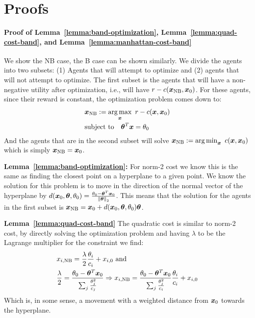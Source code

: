 \section{Proofs}\label{sec:app-proofs}

\paragraph{Proof of Lemma~\ref{lemma:band-optimization}, Lemma~\ref{lemma:quad-cost-band}, and Lemma~\ref{lemma:manhattan-cost-band}}We show the NB case, the B case can be shown similarly. We divide the agents into two subsets: (1) Agents that will attempt to optimize and (2) agents that will not attempt to optimize. The first subset is the agents that will have a non-negative utility after optimization, i.e., will have $r-c({\bm{x}}_\text{NB}, {\bm{x}}_0)$. For these agents, since their reward is constant, the optimization problem comes down to:
\begin{align}
    &{\bm{x}}_\text{NB} := \operatorname*{arg\,max}_{\bm{x}} ~ r - c({\bm{x}}, {\bm{x}}_0) \notag\\
    &\text{subject to}\quad {\bm{\theta}}^T{\bm{x}} = \theta_0
\end{align}
And the agents that are in the second subset will solve ${\bm{x}}_\text{NB} := \operatorname*{arg\,min}_{\bm{x}} ~ c({\bm{x}}, {\bm{x}}_0)$ which is simply ${\bm{x}}_\text{NB}={\bm{x}}_0$.

\textbf{Lemma~\ref{lemma:band-optimization}:} For norm-2 cost we know this is the same as finding the closest point on a hyperplane to a given point. We know the solution for this problem is to move in the direction of the normal vector of the hyperplane by $d({\bm{x}}_0, {\bm{\theta}}, \theta_0)=\frac{\theta_0-{\bm{\theta}}^T{\bm{x}}_0}{\norm{{\bm{\theta}}}_2}$. This means that the solution for the agents in the first subset is ${\bm{x}}_\text{NB} = {\bm{x}}_0 + d({\bm{x}}_0, {\bm{\theta}}, \theta_{0}){\bm{\theta}}$.

\textbf{Lemma~\ref{lemma:quad-cost-band}} The quadratic cost is similar to norm-2 cost, by directly solving the optimization problem and having $\lambda$ to be the Lagrange multiplier for the constraint we find:
\begin{align}
    &x_{i, \text{NB}} = \frac{\lambda}{2}\frac{\theta_i}{c_i}+x_{i, 0} \text{ and } \notag\\
    &\frac{\lambda}{2} = \frac{\theta_0-{\bm{\theta}}^T{\bm{x}}_0}{\sum_j \frac{\theta_j^2}{c_j}}\Rightarrow x_{i, \text{NB}} = \frac{\theta_0-{\bm{\theta}}^T{\bm{x}}_0}{\sum_j\frac{\theta_j^2}{c_i}}\frac{\theta_i}{c_i}+x_{i, 0}
\end{align}
Which is, in some sense, a movement with a weighted distance from ${\bm{x}}_0$ towards the hyperplane. 

